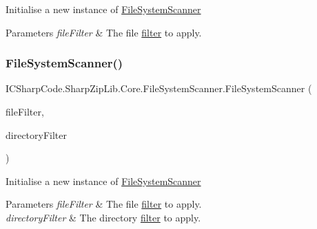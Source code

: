 Initialise a new instance of \hyperlink{class_i_c_sharp_code_1_1_sharp_zip_lib_1_1_core_1_1_file_system_scanner}{File\+System\+Scanner} 


\begin{DoxyParams}{Parameters}
{\em file\+Filter} & The file \hyperlink{interface_i_c_sharp_code_1_1_sharp_zip_lib_1_1_core_1_1_i_scan_filter}{filter} to apply.\\
\hline
\end{DoxyParams}
\mbox{\label{class_i_c_sharp_code_1_1_sharp_zip_lib_1_1_core_1_1_file_system_scanner_a28d75dbc4b0cb66deeabb6625c1eea60}} 
\subsubsection{\texorpdfstring{File\+System\+Scanner()}{FileSystemScanner()}\hspace{0.1cm}{\footnotesize\ttfamily [4/4]}}
{\footnotesize\ttfamily I\+C\+Sharp\+Code.\+Sharp\+Zip\+Lib.\+Core.\+File\+System\+Scanner.\+File\+System\+Scanner (\begin{DoxyParamCaption}\item[{\hyperlink{interface_i_c_sharp_code_1_1_sharp_zip_lib_1_1_core_1_1_i_scan_filter}{I\+Scan\+Filter}}]{file\+Filter,  }\item[{\hyperlink{interface_i_c_sharp_code_1_1_sharp_zip_lib_1_1_core_1_1_i_scan_filter}{I\+Scan\+Filter}}]{directory\+Filter }\end{DoxyParamCaption})\hspace{0.3cm}{\ttfamily [inline]}}



Initialise a new instance of \hyperlink{class_i_c_sharp_code_1_1_sharp_zip_lib_1_1_core_1_1_file_system_scanner}{File\+System\+Scanner} 


\begin{DoxyParams}{Parameters}
{\em file\+Filter} & The file \hyperlink{interface_i_c_sharp_code_1_1_sharp_zip_lib_1_1_core_1_1_i_scan_filter}{filter} to apply.\\
\hline
{\em directory\+Filter} & The directory \hyperlink{interface_i_c_sharp_code_1_1_sharp_zip_lib_1_1_core_1_1_i_scan_filter}{filter} to apply.\\
\hline
\end{DoxyParams}


